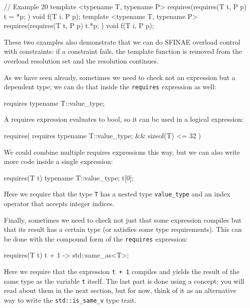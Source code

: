 \begin{code}
// Example 20
template <typename T, typename P>
requires(requires(T t, P p) { t = *p; }) void f(T i, P p);
template <typename T, typename P>
requires(requires(T t, P p) { t.*p; }) void f(T i, P p);
\end{code}

These two examples also demonstrate that we can do SFINAE overload control with constraints: if a constraint fails, the template function is removed from the overload resolution set and the resolution continues.

As we have seen already, sometimes we need to check not an expression but a dependent type; we can do that inside the \texttt{requires} expression as well:

\begin{code}
requires { typename T::value_type; }
\end{code}

A requires expression evaluates to bool, so it can be used in a logical expression:

\begin{code}
requires(
  requires { typename T::value_type; } &&
  sizeof(T) <= 32
)
\end{code}

We could combine multiple requires expressions this way, but we can also write more code inside a single expression:

\begin{code}
requires(T t) { typename T::value_type; t[0]; }
\end{code}

Here we require that the type \texttt{T} has a nested type \texttt{value\_type} and an index operator that accepts integer indices.

Finally, sometimes we need to check not just that some expression compiles but that its result has a certain type (or satisfies some type requirements). This can be done with the compound form of the \texttt{requires} expression:

\begin{code}
requires(T t) { { t + 1 } -> std::same_as<T>; }
\end{code}

Here we require that the expression \texttt{t\ +\ 1} compiles and yields the result of the same type as the variable \texttt{t} itself. The last part is done using a concept; you will read about them in the next section, but for now, think of it as an alternative way to write the \texttt{std::is\_same\_v} type trait.

